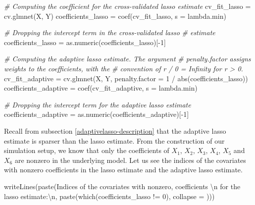 \documentclass[
]{book}
\newenvironment{Shaded}{\begin{snugshade}}{\end{snugshade}}
\newcommand{\AttributeTok}[1]{\textcolor[rgb]{0.77,0.63,0.00}{#1}}
\newcommand{\CommentTok}[1]{\textcolor[rgb]{0.56,0.35,0.01}{\textit{#1}}}
\newcommand{\DecValTok}[1]{\textcolor[rgb]{0.00,0.00,0.81}{#1}}
\newcommand{\FunctionTok}[1]{\textcolor[rgb]{0.00,0.00,0.00}{#1}}
\newcommand{\NormalTok}[1]{#1}
\newcommand{\OtherTok}[1]{\textcolor[rgb]{0.56,0.35,0.01}{#1}}
\newcommand{\SpecialCharTok}[1]{\textcolor[rgb]{0.00,0.00,0.00}{#1}}
\newcommand{\StringTok}[1]{\textcolor[rgb]{0.31,0.60,0.02}{#1}}
\begin{document}
\begin{Shaded}
\begin{Highlighting}[]
\CommentTok{\# Computing the coefficient for the cross{-}validated lasso estimate}
\NormalTok{cv\_fit\_lasso }\OtherTok{=} \FunctionTok{cv.glmnet}\NormalTok{(X, Y)}
\NormalTok{coefficients\_lasso }\OtherTok{=} \FunctionTok{coef}\NormalTok{(cv\_fit\_lasso, }\AttributeTok{s =} \StringTok{\textquotesingle{}lambda.min\textquotesingle{}}\NormalTok{)}

\CommentTok{\# Dropping the intercept term in the cross{-}validated lasso}
\CommentTok{\# estimate}
\NormalTok{coefficients\_lasso }\OtherTok{=} \FunctionTok{as.numeric}\NormalTok{(coefficients\_lasso)[}\SpecialCharTok{{-}}\DecValTok{1}\NormalTok{]}

\CommentTok{\# Computing the adaptive lasso estimate. The argument}
\CommentTok{\# \textquotesingle{}penalty.factor\textquotesingle{} assigns weights to the coefficients, with the}
\CommentTok{\# convention of r / 0 = Infinity for r \textgreater{} 0.}
\NormalTok{cv\_fit\_adaptive }\OtherTok{=}
  \FunctionTok{cv.glmnet}\NormalTok{(X, Y, }\AttributeTok{penalty.factor =} \DecValTok{1} \SpecialCharTok{/} \FunctionTok{abs}\NormalTok{(coefficients\_lasso))}
\NormalTok{coefficients\_adaptive }\OtherTok{=} \FunctionTok{coef}\NormalTok{(cv\_fit\_adaptive, }\AttributeTok{s =} \StringTok{\textquotesingle{}lambda.min\textquotesingle{}}\NormalTok{)}

\CommentTok{\# Dropping the intercept term for the adaptive lasso estimate}
\NormalTok{coefficients\_adaptive }\OtherTok{=} \FunctionTok{as.numeric}\NormalTok{(coefficients\_adaptive)[}\SpecialCharTok{{-}}\DecValTok{1}\NormalTok{]}
\end{Highlighting}
\end{Shaded}

Recall from subsection \ref{adaptivelasso-description} that the adaptive lasso estimate is sparser than the lasso estimate. From the construction of our simulation setup, we know that only the coefficients of \(X_1\), \(X_2\), \(X_3\), \(X_4\), \(X_5\) and \(X_6\) are nonzero in the underlying model. Let us see the indices of the covariates with nonzero coefficients in the lasso estimate and the adaptive lasso estimate.

\begin{Shaded}
\begin{Highlighting}[]
\FunctionTok{writeLines}\NormalTok{(}\FunctionTok{paste}\NormalTok{(}\StringTok{\textquotesingle{}Indices of the covariates with nonzero\textquotesingle{}}\NormalTok{,}
                 \StringTok{\textquotesingle{}coefficients }\SpecialCharTok{\textbackslash{}n}\StringTok{ for the lasso estimate:}\SpecialCharTok{\textbackslash{}n}\StringTok{\textquotesingle{}}\NormalTok{,}
                 \FunctionTok{paste}\NormalTok{(}\FunctionTok{which}\NormalTok{(coefficients\_lasso }\SpecialCharTok{!=} \DecValTok{0}\NormalTok{),}
                       \AttributeTok{collapse =} \StringTok{\textquotesingle{} \textquotesingle{}}\NormalTok{)))}
\end{Highlighting}
\end{Shaded}
\end{document}
